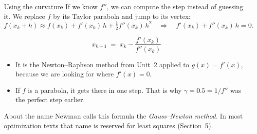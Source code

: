 \documentclass[aspectratio=169,10pt]{beamer}
\begin{document}
\begin{frame}{Using the curvature}
  If we know $f''$, we can compute the step instead of guessing it. We replace $f$ by its Taylor parabola and jump to its vertex:
  \[
    f(x_k + h) \approx f(x_k) + f'(x_k)\,h + \tfrac{1}{2} f''(x_k)\,h^2
    \quad\Longrightarrow\quad
    f'(x_k) + f''(x_k)\,h = 0 .
  \]
  \begin{ecuacion}
    \[ x_{k+1} \;=\; x_k - \frac{f'(x_k)}{f''(x_k)} \]
  \end{ecuacion}
  \begin{itemize}
    \item It is the Newton--Raphson method from Unit~2 applied to $g(x)=f'(x)$, because we are looking for where $f'(x)=0$.
    \item If $f$ is a parabola, it gets there in one step. That is why $\gamma = 0.5 = 1/f''$ was the perfect step earlier.
  \end{itemize}
  \begin{alertblock}{About the name}
    Newman calls this formula the \emph{Gauss--Newton method}. In most optimization texts that name is reserved for least squares (Section~5).
  \end{alertblock}
\end{frame}
\end{document}
